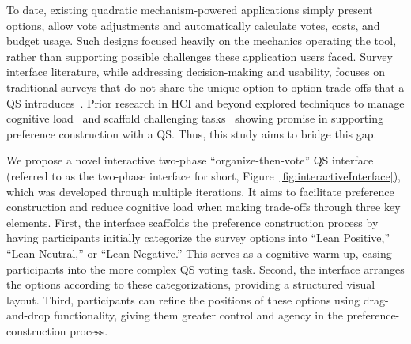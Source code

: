 
To date, existing quadratic mechanism-powered applications simply present options, allow vote adjustments and automatically calculate votes, costs, and budget usage. Such designs focused heavily on the mechanics operating the tool, rather than supporting possible challenges these application users faced. Survey interface literature, while addressing decision-making and usability, focuses on traditional surveys that do not share the unique option-to-option trade-offs that a QS introduces~\cite{engstrom2020politics, weijtersEffectRatingScale2010, kierujVariationsResponseStyle2010, toepoelSmileysStarsHearts2019, farzandAestheticsEvaluatingResponse2024, pielotDidYouMisclick2024}. Prior research in HCI and beyond explored techniques to manage cognitive load~\cite{paula2023, oviatt2006human, toepoelSmileysStarsHearts2019, softwareBrad2021, reis2012towards} and scaffold challenging tasks~\cite{task2014, moderate2021, ibili2019effect, amyChatSensing2018} showing promise in supporting preference construction with a QS. Thus, this study aims to bridge this gap.


We propose a novel interactive two-phase ``organize-then-vote'' QS interface (referred to as the two-phase interface for short, Figure~\ref{fig:interactiveInterface}), which was developed through multiple iterations. It aims to facilitate preference construction and reduce cognitive load when making trade-offs through three key elements. First, the interface scaffolds the preference construction process by having participants initially categorize the survey options into ``Lean Positive,'' ``Lean Neutral,'' or ``Lean Negative.'' This serves as a cognitive warm-up, easing participants into the more complex QS voting task. Second, the interface arranges the options according to these categorizations, providing a structured visual layout. Third, participants can refine the positions of these options using drag-and-drop functionality, giving them greater control and agency in the preference-construction process. %

